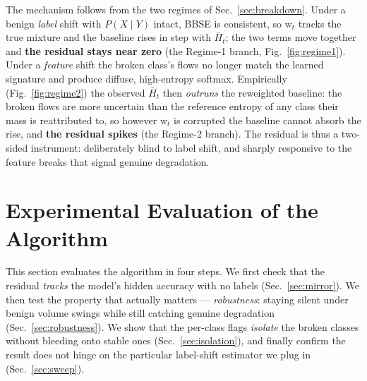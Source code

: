The mechanism follows from the two regimes of Sec.~\ref{sec:breakdown}. Under a
benign \emph{label} shift with $P(X\mid Y)$ intact, BBSE is consistent, so
$\mathrm{w}_t$ tracks the true mixture and the baseline rises in step with
$\bar H_t$; the two terms move together and \textbf{the residual stays near zero}
(the Regime-1 branch, Fig.~\ref{fig:regime1}). Under a \emph{feature} shift the
broken class's flows no longer match the learned signature and produce diffuse,
high-entropy softmax. Empirically (Fig.~\ref{fig:regime2}) the observed
$\bar H_t$ then \emph{outruns} the reweighted baseline: the broken flows are more
uncertain than the reference entropy of any class their mass is reattributed to,
so however $\mathrm{w}_t$ is corrupted the baseline cannot absorb the rise, and
\textbf{the residual spikes} (the Regime-2 branch). The residual is thus a
two-sided instrument: deliberately blind to label shift, and sharply responsive
to the feature breaks that signal genuine degradation.

\section{Experimental Evaluation of the Algorithm}
\label{sec:eval}

This section evaluates the algorithm in four steps. We first check that the residual
\emph{tracks} the model's hidden accuracy with no labels
(Sec.~\ref{sec:mirror}). We then test the property that actually matters ---
\emph{robustness}: staying silent under benign volume swings while still catching
genuine degradation (Sec.~\ref{sec:robustness}). We show that the per-class flags
\emph{isolate} the broken classes without bleeding onto stable ones
(Sec.~\ref{sec:isolation}), and finally confirm the result does not hinge on the
particular label-shift estimator we plug in (Sec.~\ref{sec:sweep}).

